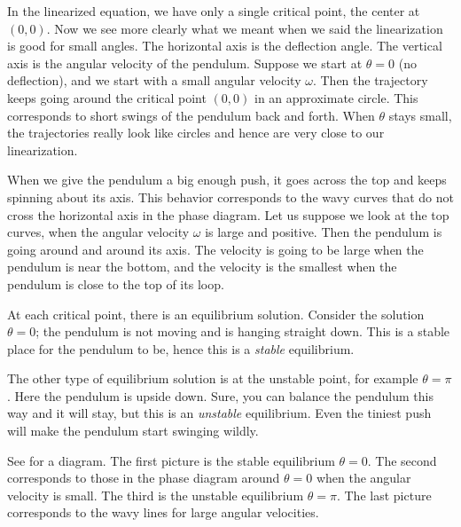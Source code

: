 In the linearized equation, we have only a single critical point, the center
at $(0,0)$.  Now we see more clearly what we meant when we said the
linearization is good for small angles.  The horizontal axis is the
deflection angle.  The vertical axis is the angular velocity of the
pendulum.  Suppose we start at $\theta = 0$ (no deflection), and
we start with a small angular velocity $\omega$.  Then the trajectory keeps going
around the critical point $(0,0)$ in an approximate circle.  This
corresponds to short swings of the pendulum back and forth.  When $\theta$
stays small, the trajectories really look like circles and hence are very
close to our linearization.

When we give the pendulum a big enough push, it
goes across the top and keeps spinning about its axis.  This behavior
corresponds to the
wavy curves that do not cross the horizontal axis in the phase diagram.
Let us suppose we look at the top curves, when the angular velocity $\omega$
is large and positive.  Then the pendulum is going
around and around its axis.  The velocity is going to
be large when the pendulum is near the bottom, and the velocity is the
smallest when the pendulum
is close to the top of its loop.

At each critical point, there is an equilibrium solution.  Consider
the solution
$\theta = 0$;  the pendulum is not moving
and is hanging straight down.  This is a stable place for the
pendulum to be, hence this is a \emph{stable} equilibrium.

The other type of equilibrium solution is at the unstable point, for example
$\theta = \pi$.  Here the pendulum is upside down.
Sure, you can balance the
pendulum this way and it will stay, but this is an \emph{unstable} equilibrium.
Even the tiniest push will make the pendulum start swinging wildly.

See  for a diagram.  The first picture is the
stable equilibrium $\theta = 0$.  The second corresponds to those
 in the phase diagram around $\theta =0$ when the angular
velocity is small.  The third is the unstable equilibrium $\theta =
\pi$.  The last picture corresponds to the wavy lines for large angular
velocities.

\begin{myfig}
\capstart
{}
\caption{Various possibilities for the motion of the pendulum. \label{fig:nlin-pend}}
\end{myfig}

